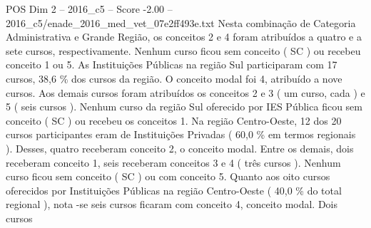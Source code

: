 \begin{textsample}{POS Dim 2 – 2016\_c5 – Score -2.00 – 2016\_c5/enade\_2016\_med\_vet\_07e2ff493e.txt}
Nesta combinação de Categoria Administrativa e Grande Região, os conceitos 2 e 4 foram atribuídos a quatro e a sete cursos, respectivamente.
Nenhum curso ficou sem conceito ( SC ) ou recebeu conceito 1 ou 5.
As Instituições Públicas na região Sul participaram com 17 cursos, 38,6 \% dos cursos da região.
O conceito modal foi 4, atribuído a nove cursos.
Aos demais cursos foram atribuídos os conceitos 2 e 3 ( um curso, cada ) e 5 ( seis cursos ).
Nenhum curso da região Sul oferecido por IES Pública ficou sem conceito ( SC ) ou recebeu os conceitos 1.
Na região Centro-Oeste, 12 dos 20 cursos participantes eram de Instituições Privadas ( 60,0 \% em termos regionais ).
Desses, quatro receberam conceito 2, o conceito modal.
Entre os demais, dois receberam conceito 1, seis receberam conceitos 3 e 4 ( três cursos ).
Nenhum curso ficou sem conceito ( SC ) ou com conceito 5.
Quanto aos oito cursos oferecidos por Instituições Públicas na região Centro-Oeste ( 40,0 \% do total regional ), nota -se seis cursos ficaram com conceito 4, conceito modal.
Dois cursos

\end{textsample}
